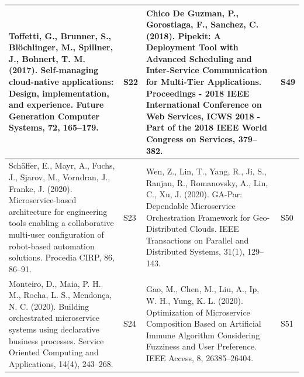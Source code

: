 \documentclass{article}
\begin{document}
\begin{appendices}
\begin{table}
\begin{center}
\begin{tabular}{ | m{20em} | m{1cm}| m{20em} | m{1cm} | }
Toffetti, G., Brunner, S., Blöchlinger, M., Spillner, J.,  Bohnert, T. M. (2017). Self-managing cloud-native applications: Design, implementation, and experience. Future Generation Computer Systems, 72, 165–179.~                                                                                                                                      & S22            & Chico De Guzman, P., Gorostiaga, F.,  Sanchez, C. (2018). Pipekit: A Deployment Tool with Advanced Scheduling and Inter-Service Communication for Multi-Tier Applications. Proceedings - 2018 IEEE International Conference on Web Services, ICWS 2018 - Part of the 2018 IEEE World Congress on Services, 379–382.                                                                                                            & S49             \\ 
\hline
Schäffer, E., Mayr, A., Fuchs, J., Sjarov, M., Vorndran, J.,  Franke, J. (2020). Microservice-based architecture for engineering tools enabling a collaborative multi-user configuration of robot-based automation solutions. Procedia CIRP, 86, 86–91.                                                                                                   & S23            & Wen, Z., Lin, T., Yang, R., Ji, S., Ranjan, R., Romanovsky, A., Lin, C.,  Xu, J. (2020). GA-Par: Dependable Microservice Orchestration Framework for Geo-Distributed Clouds. IEEE Transactions on Parallel and Distributed Systems, 31(1), 129–143.                                                                                                                                                                            & S50             \\ 
\hline
Monteiro, D., Maia, P. H. M., Rocha, L. S.,  Mendonça, N. C. (2020). Building orchestrated microservice systems using declarative business processes. Service Oriented Computing and Applications, 14(4), 243–268.                                                                                                                                        & S24            & Gao, M., Chen, M., Liu, A., Ip, W. H.,  Yung, K. L. (2020). Optimization of Microservice Composition Based on Artificial Immune Algorithm Considering Fuzziness and User Preference. IEEE Access, 8, 26385–26404.                                                                                                                                                                                                              & S51             \\ 
\hline

\end{tabular}
\end{center}
\end{table}
\end{appendices}
\end{document}
